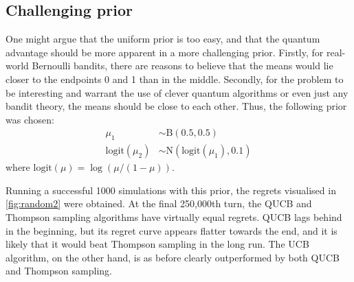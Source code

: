 \subsection{Challenging prior}
One might argue that the uniform prior is too easy, and that the quantum advantage should be more apparent in a more challenging prior.
Firstly, for real-world Bernoulli bandits, there are reasons to believe that the means would lie closer to the endpoints 0 and 1 than in the middle.
Secondly, for the problem to be interesting and warrant the use of clever quantum algorithms or even just any bandit theory, the means should be close to each other.
Thus, the following prior was chosen:
\begin{equation}
    \label{eq:challenging_prior}
    \begin{aligned}
        \mu_1               & \sim \text{B}(0.5, 0.5)                 \\
        \text{logit}(\mu_2) & \sim \text{N}(\text{logit}(\mu_1), 0.1)
    \end{aligned}
\end{equation}
where $\text{logit}(\mu) = \log(\mu/(1-\mu))$.

Running a successful 1000 simulations with this prior, the regrets visualised in \cref{fig:random2} were obtained.
At the final 250,000th turn, the QUCB and Thompson sampling algorithms have virtually equal regrets.
QUCB lags behind in the beginning, but its regret curve appears flatter towards the end, and it is likely that it would beat Thompson sampling in the long run.
The UCB algorithm, on the other hand, is as before clearly outperformed by both QUCB and Thompson sampling.



